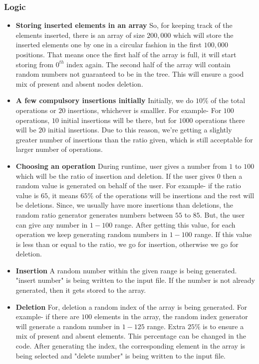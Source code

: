 \documentclass{article}
\begin{document}
\subsubsection{Logic}
\begin{itemize}
	\item \textbf{Storing inserted elements in an array}\newline
	So, for keeping track of the elements inserted, there is an array of size $200,000$ which will store the inserted elements one by one in a circular fashion in the first $100,000$ positions. That means once the first half of the array is full, it will start storing from $0^{th}$ index again. The second half of the array will contain random numbers not guaranteed to be in the tree. This will ensure a good mix of present and absent nodes deletion.
	\item \textbf{A few compulsory insertions initially}\newline
	Initially, we do $10\%$ of the total operations or $20$ insertions, whichever is smalller. For example- For $100$ operations, $10$ initial insertions will be there, but for $1000$ operations there will be $20$ initial insertions. Due to this reason, we're getting a slightly greater number of insertions than the ratio given, which is still acceptable for larger number of operations.
	\item \textbf{Choosing an operation}\newline
	During runtime, user gives a number from $1$ to $100$ which will be the ratio of insertion and deletion. If the user gives $0$ then a random value is generated on behalf of the user. For example- if the ratio value is $65$, it means $65\%$ of the operations will be insertions and the rest will be deletions. Since, we usually have more insertions than deletions, the random ratio generator generates numbers between $55$ to $85$. But, the user can give any number in $1-100$ range. After getting this value, for each operation we keep generating random numbers in $1-100$ range. If this value is less than or equal to the ratio, we go for insertion, otherwise we go for deletion.
	\item \textbf{Insertion}\newline
	A random number within the given range is being generated. "insert number" is being written to the input file. If the number is not already generated, then it gets stored to the array.
	\item \textbf{Deletion}\newline
	For, deletion a random index of the array is being generated. For example- if there are $100$ elements in the array, the random index generator will generate a random number in $1-125$ range. Extra $25\%$ is to ensure a mix of present and absent elements. This percentage can be changed in the code. After generating the index, the corresponding element in the array is being selected and "delete number" is being written to the input file.

\end{itemize}
\end{document}
